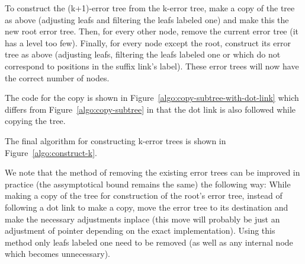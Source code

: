 To construct the (k+1)-error tree from the k-error tree, make a copy of the tree as above (adjusting leafs and filtering the leafs labeled one) and make this the new root error tree. Then, for every other node, remove the current error tree (it has a level too few). Finally, for every node except the root, construct its error tree as above (adjusting leafs, filtering the leafs labeled one or which do not correspond to positions in the suffix link's label). These error trees will now have the correct number of nodes.



The code for the copy is shown in Figure~\ref{algo:copy-subtree-with-dot-link} which differs from Figure~\ref{algo:copy-subtree} in that the dot link is also followed while copying the tree.



The final algorithm for constructing k-error trees is shown in Figure~\ref{algo:construct-k}.

We note that the method of removing the existing error trees can be improved in practice (the assymptotical bound remains the same) the following way: While making a copy of the tree for construction of the root's error tree, instead of following a dot link to make a copy, move the error tree to its destination and make the necessary adjustments inplace (this move will probably be just an adjustment of pointer depending on the exact implementation). Using this method only leafs labeled one need to be removed (as well as any internal node which becomes unnecessary).

